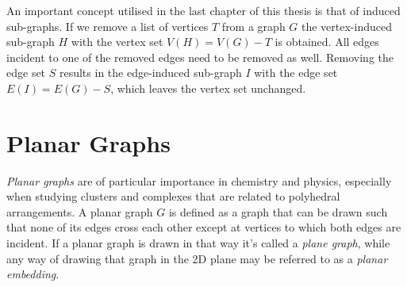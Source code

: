 An important concept utilised in the last chapter of this thesis is that of
induced sub-graphs. If we remove a list of vertices $T$ from a graph $G$ the
vertex-induced sub-graph $H$ with the vertex set $V(H)=V(G)-T$ is obtained. All
edges incident to one of the removed edges need to be removed as well. Removing
the edge set $S$ results in the edge-induced sub-graph $I$ with the edge set
$E(I)=E(G)-S$, which leaves the vertex set unchanged.

\section{Planar Graphs}
\label{sec:PlanarGraphs}

\textit{Planar graphs} are of particular importance in chemistry and physics,
especially when studying clusters and complexes that are related to polyhedral
arrangements.  A planar graph $G$ is defined as a graph that can be drawn such
that none of its edges cross each other except at vertices to which both edges
are incident. If a planar graph is drawn in that way it's called a
\textit{plane graph}, while any way of drawing that graph in the 2D plane may
be referred to as a \textit{planar embedding}.


